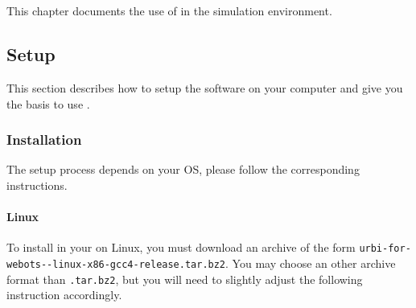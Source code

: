 \newenvironment{attribute}[4]
{
    \begin{description}
    \item[Permissions] #2.
    \item[Type] #3.
      \ifx#4\empty\else
    \item[Range] #4.
      \fi
    \item[Description]
}{
    \end{description}
}

\chapter{\webots}
\label{sec:webots}

This chapter documents the use of \urbi in the \webots simulation
environment.

\section{Setup}

This section describes how to setup the software on your computer and
give you the basis to use \uwebots{}.

\subsection{Installation}

The setup process depends on your OS, please follow the corresponding
instructions.

\subsubsection{Linux}

To install \uwebots{} in your \webots{} on Linux, you must download an
archive of the form
\texttt{urbi-for-webots--linux-x86-gcc4-release.tar.bz2}.
You may choose an other archive format than \texttt{.tar.bz2}, but you
will need to slightly adjust the following instruction accordingly.

